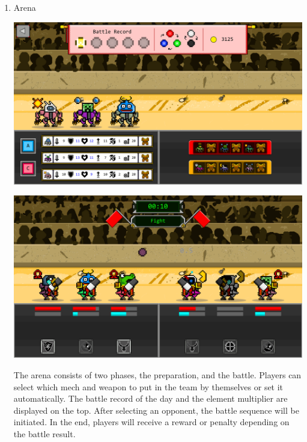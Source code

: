 \documentclass[12pt,oneside,openright,a4paper]{cpe-english-project}
\begin{document}
\begin{enumerate}
	\item Arena \\
	\begin{minipage}[c]{\textwidth}\centering
	\includegraphics[width=14cm]{figure/screenshot/screenshot-arena-prep.png}
	\end{minipage}
	\begin{minipage}[c]{\textwidth}\centering
	\includegraphics[width=14cm]{figure/screenshot/screenshot-arena-battle.png}
	\end{minipage}
	The arena consists of two phases, the preparation, and the battle. Players can select which mech and weapon to put in the team by themselves or set it automatically. The battle record of the day and the element multiplier are displayed on the top. After selecting an opponent, the battle sequence will be initiated. In the end, players will receive a reward or penalty depending on the battle result.

\end{enumerate}
\end{document}
